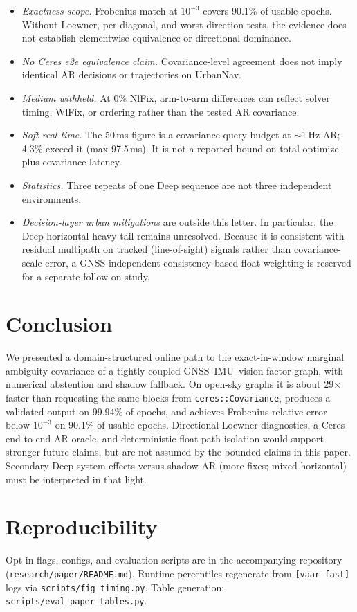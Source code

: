 \documentclass[letterpaper, journal, twocolumn]{IEEEtran}
\begin{document}
\begin{itemize}
\item \emph{Exactness scope.} Frobenius match at $10^{-3}$ covers 90.1\% of
  usable epochs. Without Loewner, per-diagonal, and worst-direction tests, the
  evidence does not establish elementwise equivalence or directional dominance.
\item \emph{No Ceres e2e equivalence claim.} Covariance-level agreement does
  not imply identical AR decisions or trajectories on UrbanNav.
\item \emph{Medium withheld.} At 0\% NlFix, arm-to-arm differences can reflect
  solver timing, WlFix, or ordering rather than the tested AR covariance.
\item \emph{Soft real-time.} The 50\,ms figure is a covariance-query budget at
  $\sim$1\,Hz AR; 4.3\% exceed it (max 97.5\,ms). It is not a reported bound on
  total optimize-plus-covariance latency.
\item \emph{Statistics.} Three repeats of one Deep sequence are not three
  independent environments.
\item \emph{Decision-layer urban mitigations} are outside this letter. In
  particular, the Deep horizontal heavy tail remains unresolved. Because it is
  consistent with residual multipath on tracked (line-of-sight) signals rather
  than covariance-scale error, a GNSS-independent consistency-based float
  weighting is reserved for a separate follow-on study.
\end{itemize}

\section{Conclusion}
\label{sec:concl}

We presented a domain-structured online path to the exact-in-window marginal
ambiguity covariance of a tightly coupled GNSS--IMU--vision factor graph,
with numerical abstention and shadow fallback.
On open-sky graphs it is about 29$\times$ faster than requesting the same
blocks from \texttt{ceres::Covariance}, produces a validated output on 99.94\%
of epochs, and achieves Frobenius relative error below $10^{-3}$ on 90.1\% of
usable epochs.
Directional Loewner diagnostics, a Ceres end-to-end AR oracle, and deterministic
float-path isolation would support stronger future claims, but are not assumed
by the bounded claims in this paper.
Secondary Deep system effects versus shadow AR (more fixes; mixed horizontal)
must be interpreted in that light.

\section*{Reproducibility}
Opt-in flags, configs, and evaluation scripts are in the accompanying
repository (\texttt{research/paper/README.md}).
Runtime percentiles regenerate from \texttt{[vaar-fast]} logs via
\texttt{scripts/fig\_timing.py}.
Table generation: \texttt{scripts/eval\_paper\_tables.py}.

\balance


\end{document}
